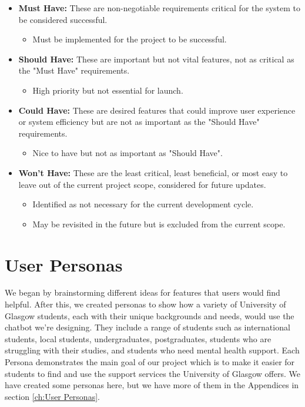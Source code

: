 \documentclass{l4proj}
\begin{document}
\begin{itemize}
    \item \textbf{Must Have:} These are non-negotiable requirements critical for the system to be considered successful.
    \begin{itemize}
        \item Must be implemented for the project to be successful.
    \end{itemize}
    
    \item \textbf{Should Have:} These are important but not vital features, not as critical as the "Must Have" requirements.
    \begin{itemize}
        \item High priority but not essential for launch.
    \end{itemize}
    
    \item \textbf{Could Have:} These are desired features that could improve user experience or system efficiency but are not as important as the "Should Have" requirements.
    \begin{itemize}
        \item Nice to have but not as important as "Should Have".
    \end{itemize}
    
    \item \textbf{Won't Have:} These are the least critical, least beneficial, or most easy to leave out of the current project scope, considered for future updates.
    \begin{itemize}
        \item Identified as not necessary for the current development cycle.
        \item May be revisited in the future but is excluded from the current scope.
    \end{itemize}
\end{itemize}

\section{User Personas}


We began by brainstorming different ideas for features that users would find helpful. After this, we created personas to show how a variety of University of Glasgow students, each with their unique backgrounds and needs, would use the chatbot we're designing. They include a range of students such as international students, local students, undergraduates, postgraduates, students who are struggling with their studies, and students who need mental health support. Each Persona demonstrates the main goal of our project which is to make it easier for students to find and use the support services the University of Glasgow offers. We have created some personas here, but we have more of them in the Appendices in section \ref{ch:User Personas}.
\end{document}
